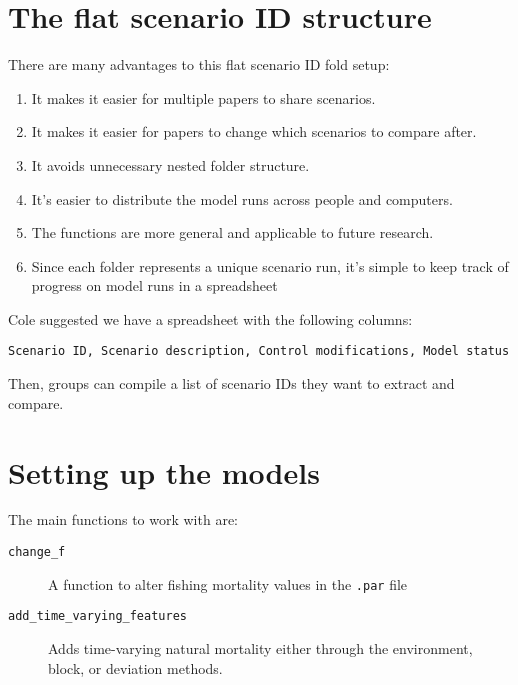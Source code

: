 \documentclass[12pt]{article}
\begin{document}
\section*{The flat scenario ID structure}
There are many advantages to this flat scenario ID fold setup:

\begin{enumerate}
  \item It makes it easier for multiple papers to share scenarios.

  \item It makes it easier for papers to change which scenarios to compare after.

  \item It avoids unnecessary nested folder structure.

  \item It's easier to distribute the model runs across people and computers.

  \item The functions are more general and applicable to future research.

  \item Since each folder represents a unique scenario run, it's simple to keep
    track of progress on model runs in a spreadsheet
  
\end{enumerate}

\noindent
Cole suggested we have a spreadsheet with the following columns:

\begin{verbatim}
Scenario ID, Scenario description, Control modifications, Model status
\end{verbatim}

\noindent
Then, groups can compile a list of scenario IDs they want to extract and compare.

\section*{Setting up the models}

The main functions to work with are:

\begin{description}
  \item[\texttt{change\_f}] A function to alter fishing mortality values in the
    \texttt{.par} file

  \item[\texttt{add\_time\_varying\_features}] Adds time-varying natural
    mortality either through the environment, block, or deviation methods.
\end{description}
\end{document}
